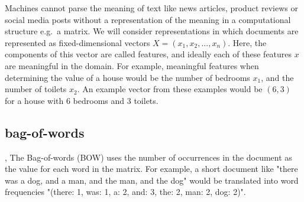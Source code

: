  Machines cannot parse the meaning of text like news articles, product reviews or social media posts  without a representation of the meaning in a computational structure e.g.\ a matrix.  We will consider representations in which documents are represented as fixed-dimensional vectors  $X = (x_1, x_2, ..., x_n)$. Here, the components of this vector are called features, and ideally each of these features $x$ are meaningful in the domain. For example, meaningful features when determining the  value of a house would be the number of bedrooms $x_1$, and the number of toilets $x_2$. An example vector from these examples would be $(6,3)$ for a house with 6 bedrooms and 3 toilets.  %










\subsection{bag-of-words}\label{bg:BOW}
,  The  Bag-of-words  (BOW) uses the number of occurrences in the document as the value for each word in the matrix.  For example, a short document like "there was a dog, and a man, and the man, and the dog" would be translated into word frequencies "(there: 1, was: 1, a: 2, and: 3, the: 2, man: 2, dog: 2)". %

